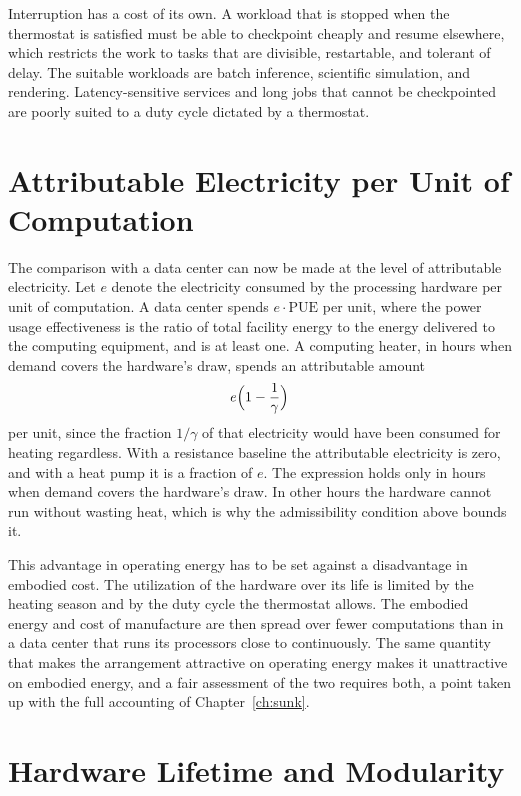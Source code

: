 Interruption has a cost of its own. A workload that is stopped when the thermostat is satisfied must be able to checkpoint cheaply and resume elsewhere, which restricts the work to tasks that are divisible, restartable, and tolerant of delay. The suitable workloads are batch inference, scientific simulation, and rendering. Latency-sensitive services and long jobs that cannot be checkpointed are poorly suited to a duty cycle dictated by a thermostat.

\section{Attributable Electricity per Unit of Computation}

The comparison with a data center can now be made at the level of attributable electricity. Let $e$ denote the electricity consumed by the processing hardware per unit of computation. A data center spends $e\cdot\mathrm{PUE}$ per unit, where the power usage effectiveness is the ratio of total facility energy to the energy delivered to the computing equipment, and is at least one. A computing heater, in hours when demand covers the hardware's draw, spends an attributable amount
\[
e\Bigl(1-\frac{1}{\gamma}\Bigr)
\]
per unit, since the fraction $1/\gamma$ of that electricity would have been consumed for heating regardless. With a resistance baseline the attributable electricity is zero, and with a heat pump it is a fraction of $e$. The expression holds only in hours when demand covers the hardware's draw. In other hours the hardware cannot run without wasting heat, which is why the admissibility condition above bounds it.

This advantage in operating energy has to be set against a disadvantage in embodied cost. The utilization of the hardware over its life is limited by the heating season and by the duty cycle the thermostat allows. The embodied energy and cost of manufacture are then spread over fewer computations than in a data center that runs its processors close to continuously. The same quantity that makes the arrangement attractive on operating energy makes it unattractive on embodied energy, and a fair assessment of the two requires both, a point taken up with the full accounting of Chapter~\ref{ch:sunk}.

\section{Hardware Lifetime and Modularity}

